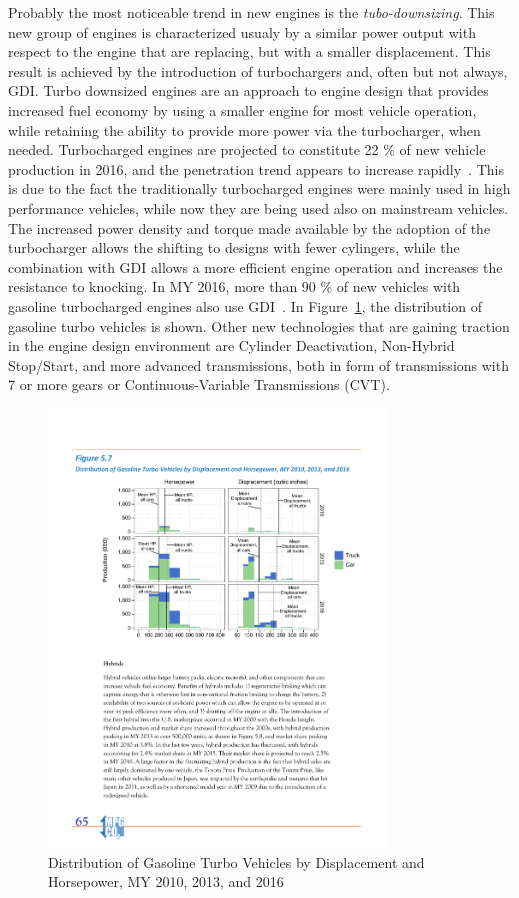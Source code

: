 Probably the most noticeable trend in new engines is the \emph{tubo-downsizing}. This new group of engines is characterized usualy by a similar power output with respect to the engine that are replacing, but with a smaller displacement. This result is achieved by the introduction of turbochargers and, often but not always, GDI. Turbo downsized engines are an approach to engine design that provides increased fuel economy by using a smaller engine for most vehicle operation, while retaining the ability to provide more power via the turbocharger, when needed. Turbocharged engines are projected to constitute 22 \% of new vehicle production in 2016, and the penetration trend appears to increase rapidly~\cite{EPA2016}. This is due to the fact the traditionally turbocharged engines were mainly used in high performance vehicles, while now they are being used also on mainstream vehicles. The increased power density and torque made available by the adoption of the turbocharger allows the shifting to designs with fewer cylingers, while the combination with GDI allows a more efficient engine operation and increases the resistance to knocking. In MY 2016, more than 90 \% of new vehicles with gasoline turbocharged engines also use GDI~\cite{EPA2016}. In Figure~\ref{fig:turbodownsizing_distribution}, the distribution of gasoline turbo vehicles is shown. Other new technologies that are gaining traction in the engine design environment are Cylinder Deactivation, Non-Hybrid Stop/Start, and more advanced transmissions, both in form of transmissions with 7 or more gears or Continuous-Variable Transmissions (CVT).

\begin{figure}[ht]
  \centering
  \includegraphics[width=0.8\textwidth]{figures/review/turbodownsizing_distribution.pdf}
  \caption{Distribution of Gasoline Turbo Vehicles by Displacement and Horsepower, MY 2010, 2013, and 2016\label{fig:turbodownsizing_distribution} }
\end{figure}



